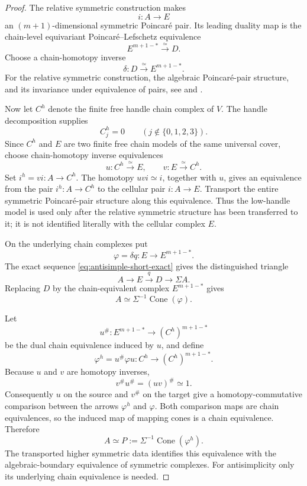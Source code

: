 \documentclass[10pt,reqno]{amsart}
\numberwithin{equation}{section}
\theoremstyle{definition}
\theoremstyle{remark}
\begin{document}
\begin{proof}
The relative symmetric construction makes
\[
i:A\longrightarrow E
\]
an \((m+1)\)-dimensional symmetric Poincar\'e pair.  Its leading
duality map is the chain-level equivariant Poincar\'e--Lefschetz
equivalence
\[
E^{m+1-*}\xrightarrow{\simeq}D.
\]
Choose a chain-homotopy inverse
\begin{equation}\label{eq:antisimple-PL-duality}
\delta:D
\xrightarrow{\simeq}
E^{m+1-*}.
\end{equation}
For the relative symmetric construction, the algebraic Poincar\'e-pair
structure, and its invariance under equivalence of pairs, see
\cite[Propositions~6.2--6.3]{RanickiSurgeryII} and
\cite[Definitions~1.6--1.7, 1.14 and Remark~2.5]{RanickiALT}.

Now let \(C^h\) denote the finite free handle chain complex of \(V\).
The handle decomposition supplies
\[
C^h_j=0\qquad(j\notin\{0,1,2,3\}).
\]
Since \(C^h\) and \(E\) are two finite free chain models of the same
universal cover, choose chain-homotopy inverse equivalences
\[
u:C^h\xrightarrow{\simeq}E,
\qquad
v:E\xrightarrow{\simeq}C^h.
\]
Set \(i^h=vi:A\to C^h\).  The homotopy \(uvi\simeq i\), together
with \(u\), gives an equivalence from the pair \(i^h:A\to C^h\) to
the cellular pair \(i:A\to E\).  Transport the entire symmetric
Poincar\'e-pair structure along this equivalence.  Thus the low-handle
model is used only after the relative symmetric structure has been
transferred to it; it is not identified literally with the cellular
complex \(E\).

On the underlying chain complexes put
\[
\varphi=\delta q:
E\longrightarrow E^{m+1-*}.
\]
The exact sequence \eqref{eq:antisimple-short-exact} gives the
distinguished triangle
\[
A\longrightarrow E\xrightarrow{q}D\longrightarrow\Sigma A.
\]
Replacing \(D\) by the chain-equivalent complex \(E^{m+1-*}\) gives
\[
A\simeq
\Sigma^{-1}\operatorname{Cone}(\varphi).
\]

Let
\[
u^\#:E^{m+1-*}\longrightarrow(C^h)^{m+1-*}
\]
be the dual chain equivalence induced by \(u\), and define
\[
\varphi^h
=u^\#\varphi u:
C^h\longrightarrow(C^h)^{m+1-*}.
\]
Because \(u\) and \(v\) are homotopy inverses,
\[
v^\#u^\#=(uv)^\#\simeq 1.
\]
Consequently \(u\) on the source and \(v^\#\) on the target give a
homotopy-commutative comparison between the arrows \(\varphi^h\) and
\(\varphi\).  Both comparison maps are chain equivalences, so the
induced map of mapping cones is a chain equivalence.  Therefore
\begin{equation}\label{eq:antisimple-correct-cone}
A
\simeq
P:=
\Sigma^{-1}\operatorname{Cone}(\varphi^h).
\end{equation}
The transported higher symmetric data identifies this equivalence
with the algebraic-boundary equivalence of symmetric complexes.  For
antisimplicity only its underlying chain equivalence is needed.


\end{proof}
\end{document}
